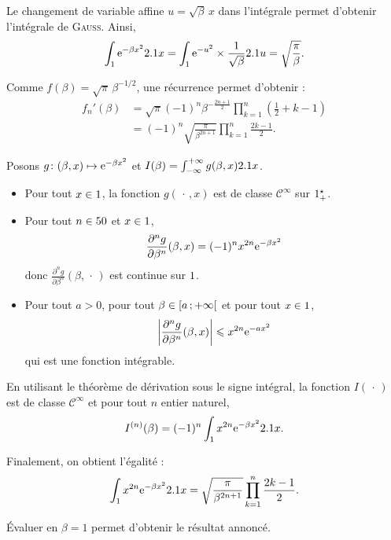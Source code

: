 \begin{solution}
\begin{reponses}
\item Le changement de variable affine $u = \sqrt{\beta}\, x$ dans l'intégrale permet d'obtenir l'intégrale de \textsc{Gauss}. Ainsi,
\[
\int_\R \e^{-\beta x^2} \d x
= \int_\R \e^{-u^2} \times \frac{1}{\sqrt{\beta}} \d u
= \sqrt{\frac{\pi}{\beta}}.
\]

\item Comme $f(\beta) = \sqrt{\pi}\, \beta^{-1/2}$, une récurrence permet d'obtenir :
\begin{align*}
f_n'(\beta)
&= \sqrt{\pi} (-1)^n \beta^{-\frac{2n+1}{2}} \prod_{k=1}^n \left(\frac{1}{2} + k - 1\right)\\
&= (-1)^n \sqrt{\frac{\pi}{\beta^{2n+1}}} \prod_{k=1}^n \frac{2k-1}{2}.
\end{align*}

\item Posons $\fonctionligne[g]{(\beta, x)}{\e^{-\beta x^2}}$ et $I(\beta) = \int_{-\infty}^{+\infty} g(\beta, x) \d x$.
\begin{itemize}
\item Pour tout $x \in \R$, la fonction $g(\,\cdot\,, x)$ est de classe $\mathscr{C}^\infty$ sur $\Rpe$.

\item Pour tout $n \in \N$ et $x \in \R$,
\[
\frac{\partial^n g}{\partial \beta^n}(\beta, x) = (-1)^n x^{2n} \e^{-\beta x^2}\]
donc $\frac{\partial^n g}{\partial \beta^n}(\beta, \,\cdot\,)$ est continue sur $\R$.

\item Pour tout $a > 0$, pour tout $\beta \in \interfo{a}{+\infty}$ et pour tout $x \in \R$,
\[
\module{\frac{\partial^n g}{\partial \beta^n}(\beta, x)} \leqslant x^{2n} \e^{-a x^2}
\]
qui est une fonction intégrable.
\end{itemize}

En utilisant le théorème de dérivation sous le signe intégral, la fonction $I(\,\cdot\,)$ est de classe $\mathscr{C}^\infty$ et pour tout $n$ entier naturel,
\[
I^{(n)}(\beta)
= (-1)^n \int_\R x^{2n} \e^{-\beta x^2} \d x.
\]

Finalement, on obtient l'égalité :
\[
\int_\R x^{2n} \e^{-\beta x^2} \d x
= \sqrt{\frac{\pi}{\beta^{2n+1}}} \prod_{k=1}^n \frac{2k-1}{2}.
\]

Évaluer en $\beta = 1$ permet d'obtenir le résultat annoncé.
\end{reponses}
\end{solution}


